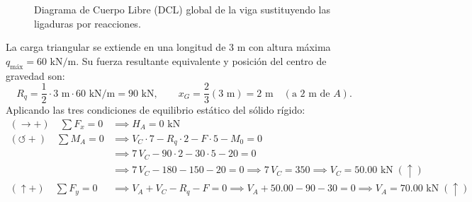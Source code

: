 \begin{figure}[H]
{%
    }
    \caption{Diagrama de Cuerpo Libre (DCL) global de la viga sustituyendo las ligaduras por reacciones.}
    \label{fig:ejemplo8_dcl}
\end{figure}


La carga triangular se extiende en una longitud de $3\text{ m}$ con altura máxima $q_{\text{máx}} = 60\text{ kN/m}$. Su fuerza resultante equivalente y posición del centro de gravedad son:
\[
    R_q = \frac{1}{2} \cdot 3\text{ m} \cdot 60\text{ kN/m} = 90\text{ kN}, \qquad x_G = \frac{2}{3}(3\text{ m}) = 2\text{ m} \quad (\text{a } 2\text{ m de } A).
\]
Aplicando las tres condiciones de equilibrio estático del sólido rígido:
\begin{align}
    (\rightarrow +) \quad \sum F_x = 0      & \implies \boxed{H_A = 0\text{ kN}}                                                                                     \\
    (\circlearrowleft +) \quad \sum M_A = 0 & \implies V_C \cdot 7 - R_q \cdot 2 - F \cdot 5 - M_0 = 0 \nonumber                                                     \\
                                            & \implies 7\,V_C - 90 \cdot 2 - 30 \cdot 5 - 20 = 0 \nonumber                                                           \\
                                            & \implies 7\,V_C - 180 - 150 - 20 = 0 \implies 7\,V_C = 350 \implies \boxed{V_C = 50.00\text{ kN}\;(\uparrow)}          \\
    (\uparrow +) \quad \sum F_y = 0         & \implies V_A + V_C - R_q - F = 0 \implies V_A + 50.00 - 90 - 30 = 0 \implies \boxed{V_A = 70.00\text{ kN}\;(\uparrow)}
\end{align}


